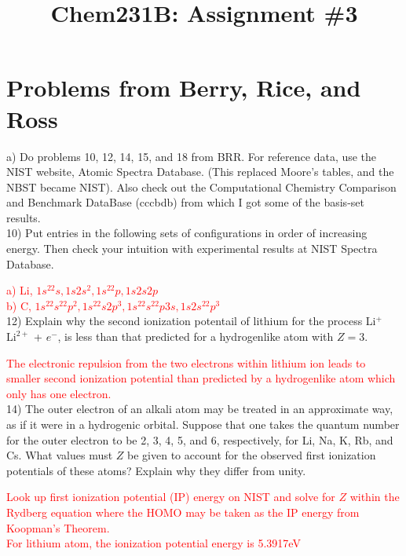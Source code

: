 \documentclass{article}
\title{Chem231B: Assignment \#3} %
\begin{document}
\maketitle

\section*{Problems from Berry, Rice, and Ross}

a) Do problems 10, 12, 14, 15, and 18 from BRR. For reference data,
use the NIST website, Atomic Spectra Database. (This replaced Moore’s
tables, and the NBST became NIST). Also check out the Computational Chemistry
Comparison and Benchmark DataBase (cccbdb) from which I got some of the
basis-set results.
\\

10) Put entries in the following sets of configurations in order of
increasing energy. Then check your intuition with experimental results
at NIST Spectra Database.

\textcolor{red}{a) Li, $1s^22s, 1s2s^2, 1s^22p, 1s2s2p$}
\\

\textcolor{red}{b) C, $1s^22s^22p^2, 1s^22s2p^3, 1s^22s^22p3s, 1s2s^22p^3$}
\\

12) Explain why the second ionization potentail of lithium for the
process Li$^+$ \rightarrow $\text{Li}^{2+}$ + $e^-$, is less than that predicted for
a hydrogenlike atom with $Z=3$.

\textcolor{red}{The electronic repulsion from the two electrons within lithium
  ion leads to smaller second ionization potential than predicted by a hydrogenlike
  atom which only has one electron.}
\\

14) The outer electron of an alkali atom may be treated in an approximate way,
as if it were in a hydrogenic orbital. Suppose that one takes the quantum number
for the outer electron to be 2, 3, 4, 5, and 6, respectively, for Li, Na,
K, Rb, and Cs. What values must $Z$ be given to account for the observed
first ionization potentials of these atoms? Explain why they differ from unity.

\textcolor{red}{Look up first ionization potential (IP) energy on NIST and solve
  for $Z$ within the Rydberg equation where the HOMO may be taken as the IP energy
  from Koopman's Theorem.}
\\

\textcolor{red}{For lithium atom, the ionization potential energy is 5.3917eV}
\\
\end{document}
